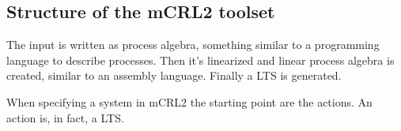 \subsection{Structure of the mCRL2 toolset}
The input is written as process algebra, something similar to a programming language to 
describe processes. Then it's linearized and linear process algebra is created, similar to an
assembly language. Finally a LTS is generated.

When specifying a system in mCRL2 the starting point are the actions. An action is, in fact, a 
LTS.


